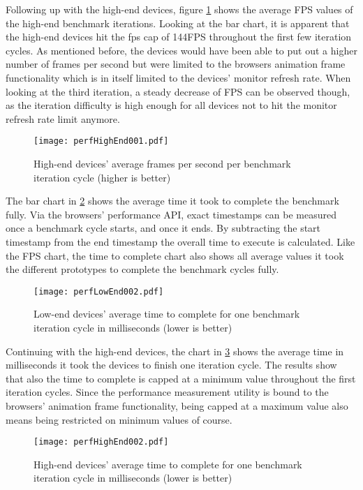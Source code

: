 Following up with the high-end devices, figure \ref{fig:perfHighEnd001} shows the average FPS values of the high-end benchmark iterations. Looking at the bar chart, it is apparent that the high-end devices hit the fps cap of 144FPS throughout the first few iteration cycles. As mentioned before, the devices would have been able to put out a higher number of frames per second but were limited to the browsers animation frame functionality which is in itself limited to the devices' monitor refresh rate. When looking at the third iteration, a steady decrease of FPS can be observed though, as the iteration difficulty is high enough for all devices not to hit the monitor refresh rate limit anymore.

\begin{figure}
\centering
\texttt{[image: perfHighEnd001.pdf]}
\caption{High-end devices' average frames per second per benchmark iteration cycle (higher is better)}
\label{fig:perfHighEnd001}
\end{figure}

The bar chart in \ref{fig:perfLowEnd002} shows the average time it took to complete the benchmark fully. Via the browsers' performance API, exact timestamps can be measured once a benchmark cycle starts, and once it ends. By subtracting the start timestamp from the end timestamp the overall time to execute is calculated. Like the FPS chart, the time to complete chart also shows all average values it took the different prototypes to complete the benchmark cycles fully.

\begin{figure}
\centering
\texttt{[image: perfLowEnd002.pdf]}
\caption{Low-end devices' average time to complete for one benchmark iteration cycle in milliseconds (lower is better)}
\label{fig:perfLowEnd002}
\end{figure}

Continuing with the high-end devices, the chart in \ref{fig:perfHighEnd002} shows the average time in milliseconds it took the devices to finish one iteration cycle. The results show that also the time to complete is capped at a minimum value throughout the first iteration cycles. Since the performance measurement utility is bound to the browsers' animation frame functionality, being capped at a maximum value also means being restricted on minimum values of course.

\begin{figure}
\centering
\texttt{[image: perfHighEnd002.pdf]}
\caption{High-end devices' average time to complete for one benchmark iteration cycle in milliseconds (lower is better)}
\label{fig:perfHighEnd002}
\end{figure}

